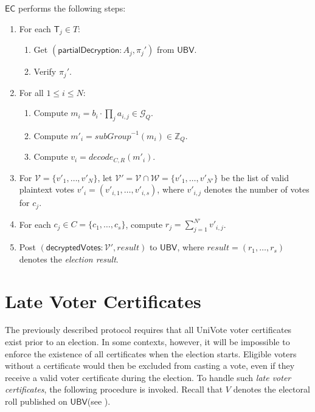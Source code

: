 \documentclass[bibtotoc,halfparskip,oneside]{scrreprt}
\newcommand{\EC}{\ensuremath{\mathsf{EC}}\xspace}
\newcommand{\UBV}{\ensuremath{\mathsf{UBV}}\xspace}
\newcommand{\Tallier}[1]{\ensuremath{\mathsf{T}_{#1}}\xspace}
\begin{document}
\EC performs the following steps:
\begin{enumerate}[resume]
	\item For each $\Tallier{j}\in T$:
	\begin{enumerate}
		\item Get $(\mathsf{partialDecryption}:A_j,\pi_{j}')$ from \UBV.
		\item Verify $\pi_{j}'$.
	\end{enumerate}
	\item For all $1\leq i\leq N$:
	\begin{enumerate}
		\item Compute $m_i=b_i\cdot\prod_j a_{i,j}\in\mathcal{G}_Q$.
		\item Compute $m'_i = \mathit{subGroup}^{-1}(m_i)\in\mathbb{Z}_Q$.
		\item Compute $v_i = \mathit{decode}_{C,R}(m'_i)$.
	\end{enumerate}
	\item For $\mathcal{V}=\{v'_1,\ldots,v'_{N}\}$, let $\mathcal{V}'=\mathcal{V}\cap \mathcal{W}=\{v'_1,\ldots,v'_{N'}\}$ be the list of valid plaintext votes $v'_i=(v'_{i,1},\ldots,v'_{i,s})$, where $v'_{i,j}$ denotes the number of votes for $c_j$.
	\item For each $c_j\in C=\{c_1,\ldots,c_s\}$, compute $r_j =\sum_{j=1}^{N'} v'_{i,j}$.
	\item Post $(\mathsf{decryptedVotes}:\mathcal{V}',\mathit{result})$ to \UBV, where $\mathit{result}=(r_1,\ldots,r_s)$ denotes the \emph{election result}.
\end{enumerate}

\section{Late Voter Certificates}

The previously described protocol requires that all UniVote voter certificates exist prior to an election. In some contexts, however, it will be impossible to enforce the existence of all certificates when the election starts. Eligible voters without a certificate would then be excluded from casting a vote, even if they receive a valid voter certificate during the election. To handle such \emph{late voter certificates}, the following procedure is invoked. Recall that $V$ denotes the electoral roll published on \UBV (see ).
\end{document}
